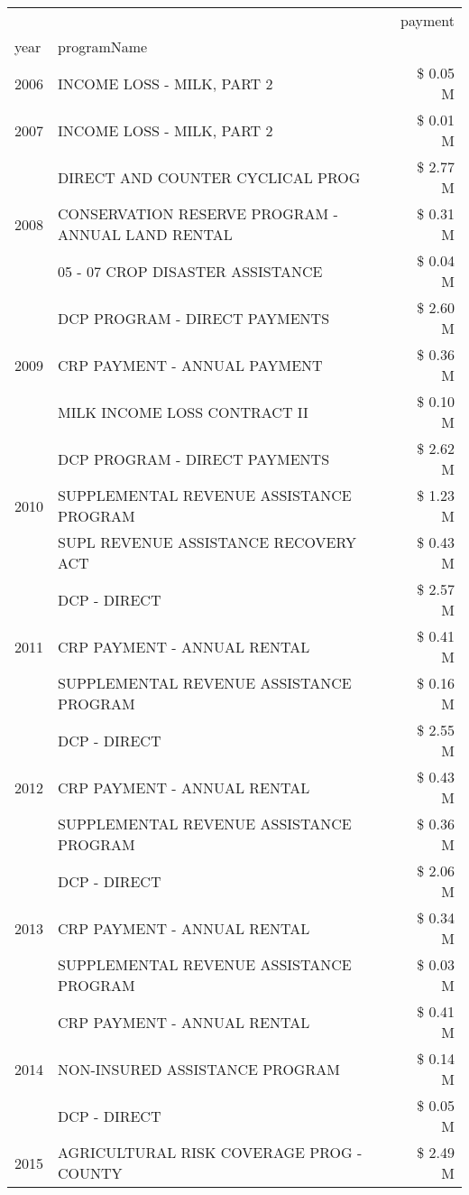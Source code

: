 \begin{tabular}{llr}
\toprule
 &  & payment \\
year & programName &  \\
\midrule
2006 & INCOME LOSS - MILK, PART 2 & \$ 0.05 M \\
\cline{1-3}
2007 & INCOME LOSS - MILK, PART 2 & \$ 0.01 M \\
\cline{1-3}
\multirow[t]{3}{*}{2008} & DIRECT AND COUNTER CYCLICAL PROG & \$ 2.77 M \\
 & CONSERVATION RESERVE PROGRAM - ANNUAL LAND RENTAL & \$ 0.31 M \\
 & 05 - 07 CROP DISASTER ASSISTANCE & \$ 0.04 M \\
\cline{1-3}
\multirow[t]{3}{*}{2009} & DCP PROGRAM - DIRECT PAYMENTS & \$ 2.60 M \\
 & CRP PAYMENT - ANNUAL PAYMENT & \$ 0.36 M \\
 & MILK INCOME LOSS CONTRACT II & \$ 0.10 M \\
\cline{1-3}
\multirow[t]{3}{*}{2010} & DCP PROGRAM - DIRECT PAYMENTS & \$ 2.62 M \\
 & SUPPLEMENTAL REVENUE ASSISTANCE PROGRAM & \$ 1.23 M \\
 & SUPL REVENUE ASSISTANCE RECOVERY ACT & \$ 0.43 M \\
\cline{1-3}
\multirow[t]{3}{*}{2011} & DCP - DIRECT & \$ 2.57 M \\
 & CRP PAYMENT - ANNUAL RENTAL & \$ 0.41 M \\
 & SUPPLEMENTAL REVENUE ASSISTANCE PROGRAM & \$ 0.16 M \\
\cline{1-3}
\multirow[t]{3}{*}{2012} & DCP - DIRECT & \$ 2.55 M \\
 & CRP PAYMENT - ANNUAL RENTAL & \$ 0.43 M \\
 & SUPPLEMENTAL REVENUE ASSISTANCE PROGRAM & \$ 0.36 M \\
\cline{1-3}
\multirow[t]{3}{*}{2013} & DCP - DIRECT & \$ 2.06 M \\
 & CRP PAYMENT - ANNUAL RENTAL & \$ 0.34 M \\
 & SUPPLEMENTAL REVENUE ASSISTANCE PROGRAM & \$ 0.03 M \\
\cline{1-3}
\multirow[t]{3}{*}{2014} & CRP PAYMENT - ANNUAL RENTAL & \$ 0.41 M \\
 & NON-INSURED ASSISTANCE PROGRAM & \$ 0.14 M \\
 & DCP - DIRECT & \$ 0.05 M \\
\cline{1-3}
\multirow[t]{3}{*}{2015} & AGRICULTURAL RISK COVERAGE PROG - COUNTY & \$ 2.49 M \\

\end{tabular}
